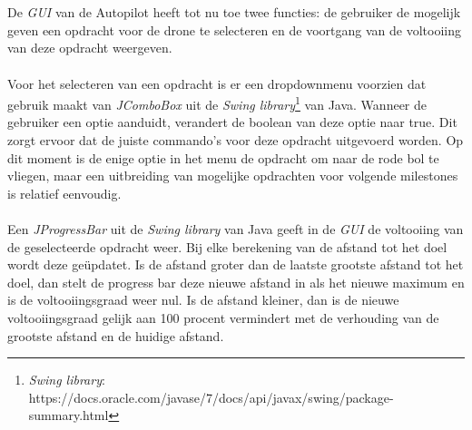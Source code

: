 \\
\\
De \textit{GUI} van de Autopilot heeft tot nu toe twee functies: de gebruiker de mogelijk geven een opdracht voor de drone te selecteren en de voortgang van de voltooiing van deze opdracht weergeven.
\\
\\
Voor het selecteren van een opdracht is er een dropdownmenu voorzien dat gebruik maakt van \textit{JComboBox} uit de \textit{Swing library}\footnote{\textit{Swing library}: https://docs.oracle.com/javase/7/docs/api/javax/swing/package-summary.html} van Java. Wanneer de gebruiker een optie aanduidt, verandert de boolean van deze optie naar true. Dit zorgt ervoor dat de juiste commando's voor deze opdracht uitgevoerd worden. Op dit moment is de enige optie in het menu de opdracht om naar de rode bol te vliegen, maar een uitbreiding van mogelijke opdrachten voor volgende milestones is relatief eenvoudig.
\\
\\
Een \textit{JProgressBar} uit de \textit{Swing library} van Java geeft in de \textit{GUI} de voltooiing van de geselecteerde opdracht weer. Bij elke berekening van de afstand tot het doel wordt deze ge\"{u}pdatet. Is de afstand groter dan de laatste grootste afstand tot het doel, dan stelt de progress bar deze nieuwe afstand in als het nieuwe maximum en is de voltooiingsgraad weer nul. Is de afstand kleiner, dan is de nieuwe voltooiingsgraad gelijk aan 100 procent vermindert met de verhouding van de grootste afstand en de huidige afstand.  
